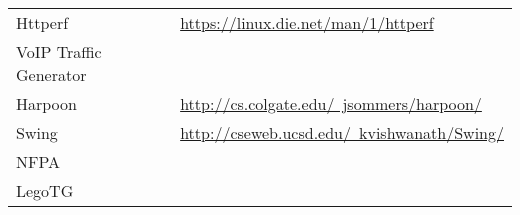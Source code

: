 \begin{table}[ht!]
\begin{tabular}{@{}ll@{}}
Httperf                 & \href{https://linux.die.net/man/1/httperf}{https://linux.die.net/man/1/httperf}                                                                                                                                           \\
VoIP Traffic Generator  &                                                                                                                                                                                                                           \\
Harpoon                 & \href{http://cs.colgate.edu/~jsommers/harpoon/}{http://cs.colgate.edu/~jsommers/harpoon/}                                                                                                                                 \\
Swing                   & \href{http://cseweb.ucsd.edu/~kvishwanath/Swing/}{http://cseweb.ucsd.edu/~kvishwanath/Swing/}                                                                                                                             \\
NFPA                    &                                                                                                                                                                                                                           \\
LegoTG                  &                                                                                                                                                                                                                           \\ \bottomrule
\end{tabular}
\end{table}

